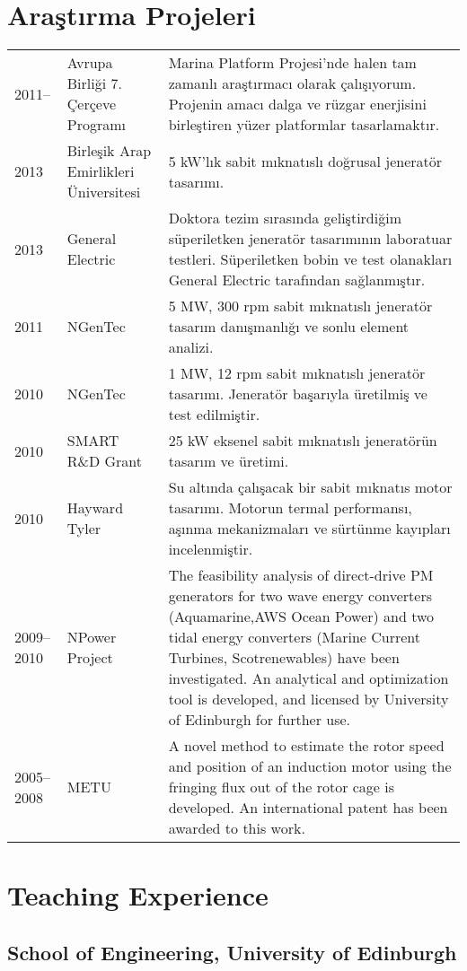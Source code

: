 \documentclass[a4paper,12pt]{article}
\begin{document}
\section{Araştırma Projeleri}
\begin{longtable}{lp{3cm}p{12cm}}
2011-- & Avrupa Birliği 7. Çerçeve Programı & Marina Platform Projesi'nde halen tam zamanlı araştırmacı olarak çalışıyorum. Projenin amacı dalga ve rüzgar enerjisini birleştiren yüzer platformlar tasarlamaktır.\\
2013 & Birleşik Arap Emirlikleri Üniversitesi & 5 kW'lık sabit mıknatıslı doğrusal jeneratör tasarımı.\\
2013 & General Electric & Doktora tezim sırasında geliştirdiğim süperiletken jeneratör tasarımının laboratuar testleri. Süperiletken bobin ve test olanakları General Electric tarafından sağlanmıştır.\\
2011 & NGenTec & 5 MW, 300 rpm sabit mıknatıslı jeneratör tasarım danışmanlığı ve sonlu element analizi.\\
2010 & NGenTec & 1 MW, 12 rpm sabit mıknatıslı jeneratör tasarımı. Jeneratör başarıyla üretilmiş ve test edilmiştir.\\
2010 & SMART R\&D Grant & 25 kW eksenel sabit mıknatıslı jeneratörün tasarım ve üretimi.\\
2010 & Hayward Tyler & Su altında çalışacak bir sabit mıknatıs motor tasarımı. Motorun termal performansı, aşınma mekanizmaları ve sürtünme kayıpları incelenmiştir.\\
2009--2010 & NPower Project & The feasibility analysis of direct-drive PM generators for two wave energy converters (Aquamarine,AWS Ocean Power) and two tidal energy converters (Marine Current Turbines, Scotrenewables) have been investigated. An analytical and optimization tool is developed, and licensed by University of Edinburgh for further use.\\
2005--2008 & METU & A novel method to estimate the rotor speed and position of an induction motor using the fringing flux out
of the rotor cage is developed. An international patent has been awarded to this work.\\
\end{longtable}

\section{Teaching Experience}

\subsection{School of Engineering, University of Edinburgh}
\end{document}
